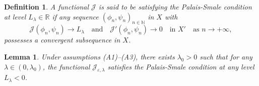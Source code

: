 \documentclass[10pt,a4paper]{amsart}
\numberwithin{equation}{section}
\newtheorem{lemma}[theo]{Lemma}
\newtheorem{definition}[theo]{Definition}
\begin{document}
\begin{definition} \rm
A functional $\mathcal{J}$ is said to be satisfying the Palais-Smale condition at 
level $L_\lambda\in \mathbb{R}$ if any sequence $(\phi_n,\psi_n)_{n\in\mathbb{N}}$ in 
$X$ with
\[
\mathcal{J}(\phi_n,\psi_n)\to L_\lambda\quad \text{and}\quad
\mathcal{J}'(\phi_n,\psi_n)\to 0\quad \text{in }  X'\quad \text{as } n\to +\infty,
\]
possesses a convergent subsequence in $X$.
\end{definition}

\begin{lemma}\label{lemma1} 
Under assumptions {\rm (A1)--(A3)}, there exists $\lambda_0>0$ such that for any 
$\lambda\in (0,\lambda_0)$, the functional $\mathcal{J}_{\varepsilon,\lambda}$ 
satisfies the Palais-Smale condition at any level $L_\lambda<0$.
\end{lemma}
\end{document}
